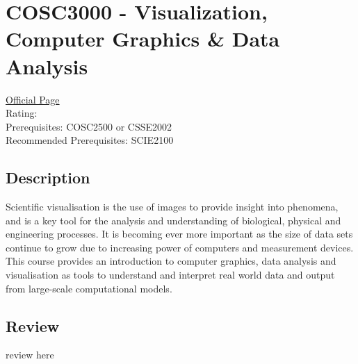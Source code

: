 \hypertarget{COSC3000}{\section{COSC3000 - Visualization, Computer Graphics \& Data Analysis}}

\large
\textcolor{turbo_purple}{\href{https://my.uq.edu.au/programs-courses/course.html?course_code=COSC3000}{Official Page}} \\
Rating: \cstar\cstar\cstar\cstar\ostar \\
Prerequisites: COSC2500 or CSSE2002 \\
Recommended Prerequisites: SCIE2100 \\

\normalsize
\subsection*{Description}
Scientific visualisation is the use of images to provide insight into phenomena, and is a key tool for the analysis and understanding of biological, physical and engineering processes.
It is becoming ever more important as the size of data sets continue to grow due to increasing power of computers and measurement devices.
This course provides an introduction to computer graphics, data analysis and visualisation as tools to understand and interpret real world data and output from large-scale computational models.

\subsection*{Review}
review here
